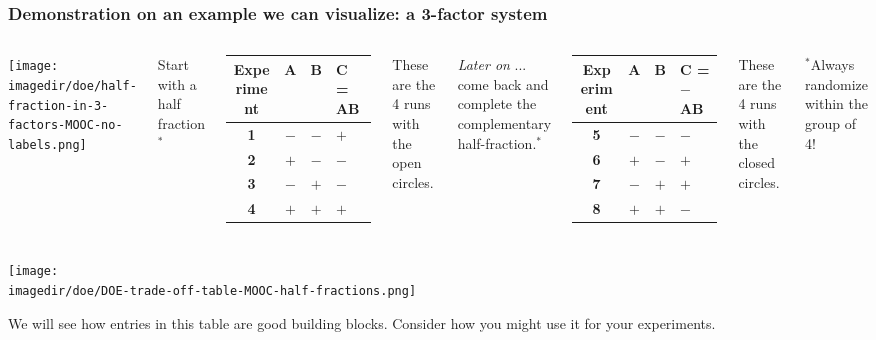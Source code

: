\begin{frame}\frametitle{Demonstration on an example we can visualize: a 3-factor system}
	\begin{columns}
			\begin{center}
				\texttt{[image: \\imagedir/doe/half-fraction-in-3-factors-MOOC-no-labels.png]}
			\end{center}
			
		
			{\color{blue}Start with a half fraction $^\ast$}
			\begin{tabulary}{\linewidth}{cccl}\hline 
				\textsf{\relax Experiment } & \textbf{\relax A } & \textbf{\relax B } & \textbf{\relax C = AB} \\
				\hline 
				\textbf{1} & \(-\) & \(-\) & \(+\) \\
				\textbf{2} & \(+\) & \(-\) & \(-\) \\
				\textbf{3} & \(-\) & \(+\) & \(-\) \\
				\textbf{4} & \(+\) & \(+\) & \(+\) \\  \hline
			\end{tabulary}
			
			{\color{myOrange}These are the 4 runs with the open circles.}

			\small
			\vspace{0.5cm}
			
			{\color{blue}\emph{Later on} ... come back and complete the complementary half-fraction.$^\ast$}
			
			\begin{tabulary}{\linewidth}{cccl}\hline 
				\textsf{\relax Experiment } & \textbf{\relax A } & \textbf{\relax B } & \textbf{\relax C = $-$AB } \\
				\hline 
				\textbf{5} & \(-\) & \(-\) & \(-\) \\
				\textbf{6} & \(+\) & \(-\) & \(+\) \\
				\textbf{7} & \(-\) & \(+\) & \(+\) \\
				\textbf{8} & \(+\) & \(+\) & \(-\) \\ \hline
			\end{tabulary}
			
			{\color{myOrange}These are the 4 runs with the closed circles.}
			
			\vspace{6pt}
			{\color{blue}$^\ast$\scriptsize {Always randomize within the group of 4!}}
\	\end{columns}
\end{frame}

\begin{frame}\frametitle{}
	\vspace{-0.5cm}
	\texttt{[image: \\imagedir/doe/DOE-trade-off-table-MOOC-half-fractions.png]}
	
	\vspace{10pt}
	We will see how entries in this table are good building blocks. Consider how you might use it for your experiments.
\end{frame}

